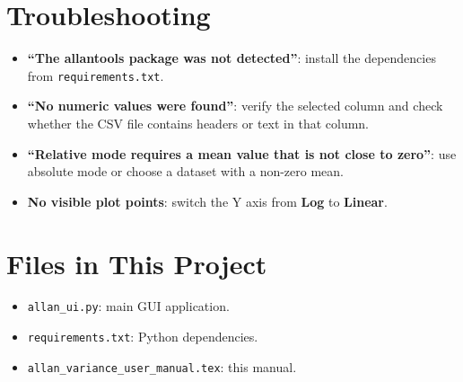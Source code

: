 \documentclass[11pt,a4paper]{article}
\begin{document}
\section{Troubleshooting}
\begin{itemize}[leftmargin=1.5em]
    \item \textbf{``The allantools package was not detected''}: install the dependencies from \texttt{requirements.txt}.
    \item \textbf{``No numeric values were found''}: verify the selected column and check whether the CSV file contains headers or text in that column.
    \item \textbf{``Relative mode requires a mean value that is not close to zero''}: use absolute mode or choose a dataset with a non-zero mean.
    \item \textbf{No visible plot points}: switch the Y axis from \textbf{Log} to \textbf{Linear}.
\end{itemize}

\section{Files in This Project}
\begin{itemize}[leftmargin=1.5em]
    \item \texttt{allan\_ui.py}: main GUI application.
    \item \texttt{requirements.txt}: Python dependencies.
    \item \texttt{allan\_variance\_user\_manual.tex}: this manual.
\end{itemize}
\end{document}

